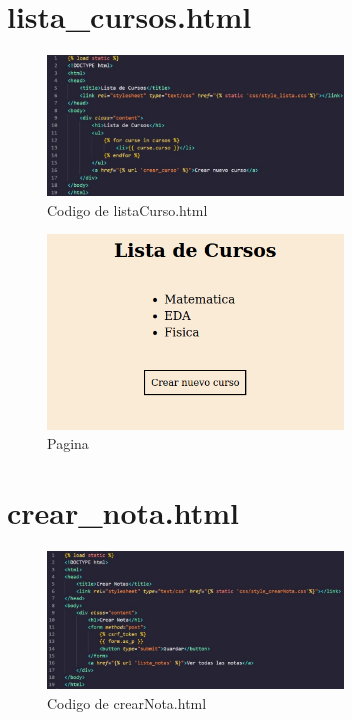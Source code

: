 \documentclass[10pt, a4paper]{article}
\begin{document}
\section{lista\_cursos.html }
\begin{figure}[H]
  \centering
  \includegraphics[width=0.7\textwidth]{img/imagen11.jpeg}
  \caption{Codigo de listaCurso.html}
\end{figure}   

\begin{figure}[H]
  \centering
  \includegraphics[width=0.7\textwidth]{img/ListaCursos.png}
  \caption{Pagina}
\end{figure}

\section{crear\_nota.html }
\begin{figure}[H]
  \centering
  \includegraphics[width=0.7\textwidth]{img/imagen9.jpeg}
  \caption{Codigo de crearNota.html}
\end{figure}   
\end{document}
